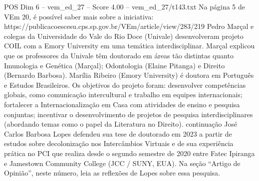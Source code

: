 \begin{textsample}{POS Dim 6 – vem\_ed\_27 – Score 4.00 – vem\_ed\_27/t143.txt}
Na página 5 de VEm 20, é possível saber mais sobre a iniciativa: https://publicacoescesu.cps.sp.gov.br/VEm/article/view/283/219 Pedro Marçal e colegas da Universidade do Vale do Rio Doce (Univale) desenvolveram projeto COIL com a Emory University em uma temática interdisciplinar.
Marçal explicou que os professores da Univale têm doutorado em áreas tão distintas quanto Imunologia e Genética (Marçal); Odontologia (Elaine Pitanga) e Direito (Bernardo Barbosa).
Marília Ribeiro (Emory University) é doutora em Português e Estudos Brasileiros.
Os objetivos do projeto foram: desenvolver competências globais, como comunicação intercultural e trabalho em equipes internacionais; fortalecer a Internacionalização em Casa com atividades de ensino e pesquisa conjuntas; incentivar o desenvolvimento de projetos de pesquisa interdisciplinares (abordando temas como o papel da Literatura no Direito). continuação José Carlos Barbosa Lopes defendeu sua tese de doutorado em 2023 a partir de estudos sobre decolonização nos Intercâmbios Virtuais e de sua experiência prática no PCI que realiza desde o segundo semestre de 2020 entre Fatec Ipiranga e Jamestown Community College (JCC / SUNY, EUA).
Na seção “Artigo de Opinião”, neste número, leia as reflexões de Lopes sobre essa pesquisa.

\end{textsample}
